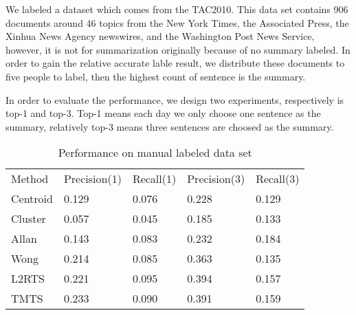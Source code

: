 \documentclass{llncs}
\begin{document}
We labeled a dataset which comes from the TAC2010. This data set contains 906 documents around 46 topics from the New York Times, the Associated Press, the Xinhua News Agency newswires, and the Washington Post News Service, however, it is not for summarization originally because of no summary labeled. In order to gain the relative accurate lable result, we distribute these documents to five people to label, then the highest count of sentence is the summary.

In order to evaluate the performance, we design two experiments, respectively is top-1 and top-3. Top-1 means each day we only choose one sentence as the summary, relatively top-3 means three sentences are choosed as the summary.

\begin{table}
\caption{Performance on manual labeled data set}
\centering
\begin{tabular}{lllll}
\hline\noalign{\smallskip}
Method   &  Precision(1) & Recall(1)  & Precision(3) & Recall(3) \\
\noalign{\smallskip}
\hline
\noalign{\smallskip}
Centroid &	0.129			& 		0.076	 			&	0.228			& 0.129			 				\\
Cluster	&	0.057			&		0.045				&	0.185			& 	0.133		 				\\
Allan		&	0.143			&		0.083				&	0.232			& 0.184			 			\\
Wong		&	0.214			&		0.085				&	0.363			& 0.135						\\
L2RTS	&	0.221			&		0.095				&	0.394			& 0.157			 				\\
TMTS	&	0.233			&		0.090				&	0.391			& 0.159							\\
\hline
\end{tabular}
\end{table}
\end{document}
